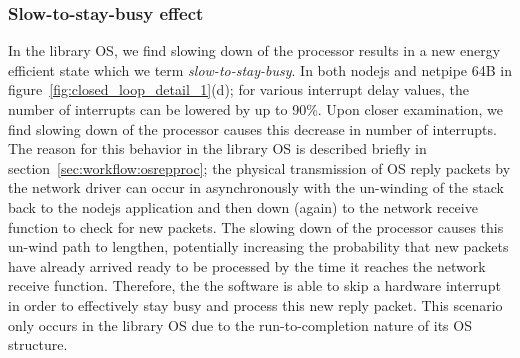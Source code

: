 
\subsubsection{Slow-to-stay-busy effect}
In the library OS, we find slowing down of the processor results in a new energy efficient state which we term \textit{slow-to-stay-busy}. In both nodejs and netpipe 64B in figure~\ref{fig:closed_loop_detail_1}(d); for various interrupt delay values, the number of interrupts can be lowered by up to 90\%. Upon closer examination, we find slowing down of the processor causes this decrease in number of interrupts. The reason for this behavior in the library OS is described briefly in section~\ref{sec:workflow:osrepproc}; the physical transmission of OS reply packets by the network driver can occur in asynchronously with the un-winding of the stack back to the nodejs application and then down (again) to the network receive function to check for new packets. The slowing down of the processor causes this un-wind path to lengthen, potentially increasing the probability that new packets have already arrived ready to be processed by the time it reaches the network receive function. Therefore, the the software is able to skip a hardware interrupt in order to effectively stay busy and process this new reply packet. This scenario only occurs in the library OS due to the run-to-completion nature of its OS structure.



